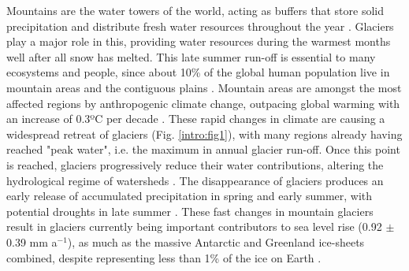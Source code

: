 Mountains are the water towers of the world, acting as buffers that store solid precipitation and distribute fresh water resources throughout the year \citep{immerzeel_importance_2020}. Glaciers play a major role in this, providing water resources during the warmest months well after all snow has melted. This late summer run-off is essential to many ecosystems and people, since about 10\% of the global human population live in mountain areas and the contiguous plains \citep{huss_global-scale_2018, cauvy-fraunie_global_2019,farinotti_large_2019}. Mountain areas are amongst the most affected regions by anthropogenic climate change, outpacing global warming  with an increase of 0.3ºC per decade \citep{ipcc_climate_2018}. These rapid changes in climate are causing a widespread retreat of glaciers (Fig. \ref{intro:fig1}), with many regions already having reached "peak water", i.e. the maximum in annual glacier run-off. Once this point is reached, glaciers progressively reduce their water contributions, altering the hydrological regime of watersheds \citep{huss_global-scale_2018}. The disappearance of glaciers produces an early release of accumulated precipitation in spring and early summer, with potential droughts in late summer \citep{brunner_future_2019}. These fast changes in mountain glaciers result in glaciers currently being important contributors to sea level rise (0.92 $\pm$ 0.39 mm a$^{-1}$), as much as the massive Antarctic and Greenland ice-sheets combined, despite representing less than 1\% of the ice on Earth \citep{zemp_global_2019, hock_glaciermip_2019}. 

